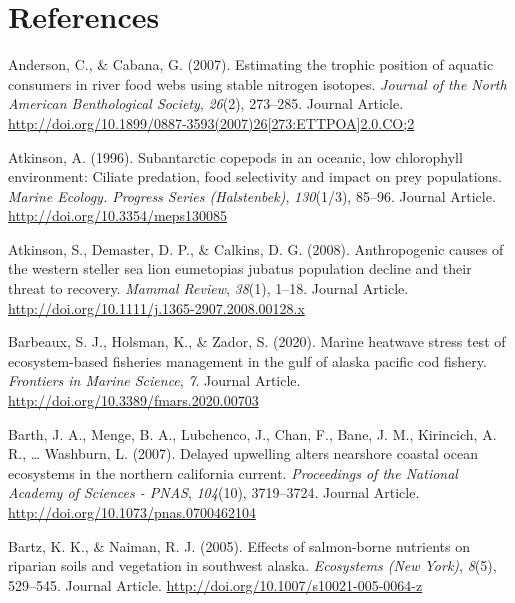 \documentclass [11pt, proquest] {uwthesis}[2015/03/03]
\begin{document}
\chapter*{References}\label{references}


\noindent

\setlength{\parindent}{-0.20in} \setlength{\leftskip}{0.20in}
\setlength{\parskip}{8pt}

\hypertarget{refs}{}
\hypertarget{ref-Anderson2007}{}
Anderson, C., \& Cabana, G. (2007). Estimating the trophic position of
aquatic consumers in river food webs using stable nitrogen isotopes.
\emph{Journal of the North American Benthological Society},
\emph{26}(2), 273--285. Journal Article.
\href{http://doi.org/10.1899/0887-3593(2007)26\%5B273:ETTPOA\%5D2.0.CO;2}{http://doi.org/10.1899/0887-3593(2007)26{[}273:ETTPOA{]}2.0.CO;2}

\hypertarget{ref-Atkinson1996}{}
Atkinson, A. (1996). Subantarctic copepods in an oceanic, low
chlorophyll environment: Ciliate predation, food selectivity and impact
on prey populations. \emph{Marine Ecology. Progress Series
(Halstenbek)}, \emph{130}(1/3), 85--96. Journal Article.
\url{http://doi.org/10.3354/meps130085}

\hypertarget{ref-Atkinson2008}{}
Atkinson, S., Demaster, D. P., \& Calkins, D. G. (2008). Anthropogenic
causes of the western steller sea lion eumetopias jubatus population
decline and their threat to recovery. \emph{Mammal Review},
\emph{38}(1), 1--18. Journal Article.
\url{http://doi.org/10.1111/j.1365-2907.2008.00128.x}

\hypertarget{ref-Barbeaux2020}{}
Barbeaux, S. J., Holsman, K., \& Zador, S. (2020). Marine heatwave
stress test of ecosystem-based fisheries management in the gulf of
alaska pacific cod fishery. \emph{Frontiers in Marine Science},
\emph{7}. Journal Article. \url{http://doi.org/10.3389/fmars.2020.00703}

\hypertarget{ref-Barth2007}{}
Barth, J. A., Menge, B. A., Lubchenco, J., Chan, F., Bane, J. M.,
Kirincich, A. R., \ldots{} Washburn, L. (2007). Delayed upwelling alters
nearshore coastal ocean ecosystems in the northern california current.
\emph{Proceedings of the National Academy of Sciences - PNAS},
\emph{104}(10), 3719--3724. Journal Article.
\url{http://doi.org/10.1073/pnas.0700462104}

\hypertarget{ref-Bartz2005}{}
Bartz, K. K., \& Naiman, R. J. (2005). Effects of salmon-borne nutrients
on riparian soils and vegetation in southwest alaska. \emph{Ecosystems
(New York)}, \emph{8}(5), 529--545. Journal Article.
\url{http://doi.org/10.1007/s10021-005-0064-z}
\end{document}
